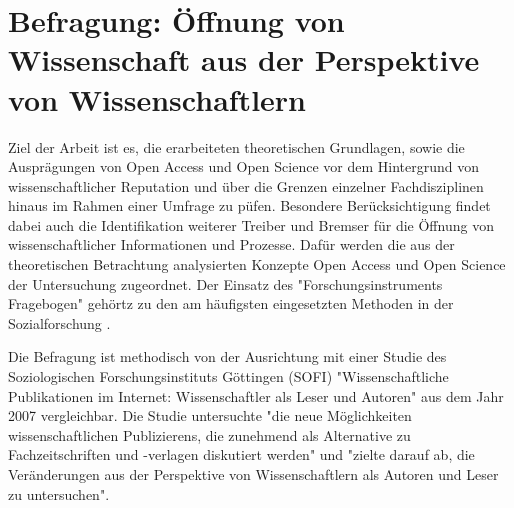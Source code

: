 \chapter{Befragung: Öffnung von Wissenschaft aus der Perspektive von Wissenschaftlern}

Ziel der Arbeit ist es, die erarbeiteten theoretischen Grundlagen, sowie die Ausprägungen von Open Access und Open Science vor dem Hintergrund von wissenschaftlicher Reputation und über die Grenzen einzelner Fachdisziplinen hinaus im Rahmen einer Umfrage zu püfen. Besondere Berücksichtigung findet dabei auch die Identifikation weiterer Treiber und Bremser für die Öffnung von wissenschaftlicher Informationen und Prozesse. Dafür werden die aus der theoretischen Betrachtung analysierten Konzepte Open Access und Open Science der Untersuchung zugeordnet. Der Einsatz des "Forschungsinstruments Fragebogen" gehörtz zu den am häufigsten eingesetzten Methoden in der Sozialforschung \cite{raab_2012_fragebogen}.

Die Befragung ist methodisch von der Ausrichtung mit einer Studie des Soziologischen Forschungsinstituts Göttingen (SOFI) "Wissenschaftliche Publikationen im Internet: Wissenschaftler als Leser und Autoren" aus dem Jahr 2007 vergleichbar. Die Studie untersuchte "die neue Möglichkeiten wissenschaftlichen Publizierens, die zunehmend als Alternative zu Fachzeitschriften und -verlagen diskutiert werden" und "zielte darauf ab, die Veränderungen aus der Perspektive von Wissenschaftlern als Autoren und Leser zu untersuchen"\cite{SOFI_Webseite}. 

